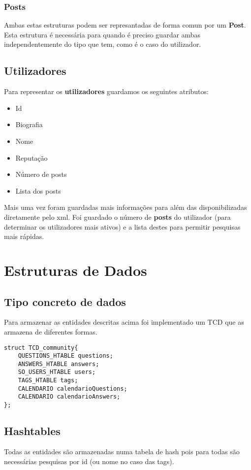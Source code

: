 \documentclass[10pt,a4paper]{article}
\begin{document}
        \subsubsection{Posts}
        Ambas estas estruturas podem ser represantadas de forma comun por um
        \textbf{Post}. Esta estrutura é necessária para quando é preciso guardar
        ambas independentemente do tipo que tem, como é o caso do utilizador.

    \subsection{Utilizadores}
    Para representar os \textbf{utilizadores} guardamos os seguintes atributos:
    \begin{multicols}{3}
    \begin{itemize}
            \item Id
            \item Biografia
            \item Nome
            \item Reputação
            \item Número de posts
            \item Lista dos posts
    \end{itemize}
    \end{multicols}
    Mais uma vez foram guardadas mais informações para além das disponibilizadas
    diretamente pelo xml. Foi guardado o número de \textbf{posts} do utilizador
    (para determinar os utilizadores mais ativos) e a lista destes para permitir
    pesquisas mais rápidas.

\section{Estruturas de Dados}
    \subsection{Tipo concreto de dados}
    Para armazenar as entidades descritas acima foi implementado um TCD que
    as armazena de diferentes formas.
    \begin{verbatim}
struct TCD_community{
    QUESTIONS_HTABLE questions;
    ANSWERS_HTABLE answers;
    SO_USERS_HTABLE users;
    TAGS_HTABLE tags;
    CALENDARIO calendarioQuestions;
    CALENDARIO calendarioAnswers;
};
    \end{verbatim}
    \subsection{Hashtables}
        Todas as entidades são armazenadas numa tabela de hash pois para todas
        são necessárias pesquisas por id (ou nome no caso das tags).
\end{document}
